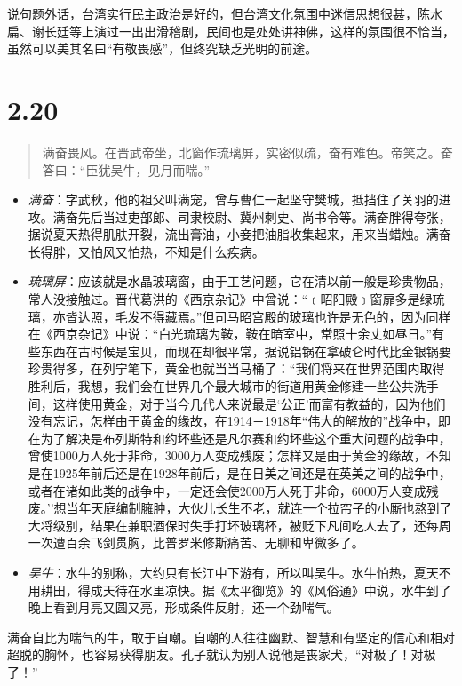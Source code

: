 \documentclass[]{book}
\providecommand{\tightlist}{%
  \setlength{\itemsep}{0pt}\setlength{\parskip}{0pt}}
\begin{document}
说句题外话，台湾实行民主政治是好的，但台湾文化氛围中迷信思想很甚，陈水扁、谢长廷等上演过一出出滑稽剧，民间也是处处讲神佛，这样的氛围很不恰当，虽然可以美其名曰``有敬畏感''，但终究缺乏光明的前途。

\section{2.20}\label{section-66}

\begin{quote}
满奋畏风。在晋武帝坐，北窗作琉璃屏，实密似疏，奋有难色。帝笑之。奋答曰：``臣犹吴牛，见月而喘。''
\end{quote}

\begin{itemize}
\tightlist
\item
  \emph{满奋}：字武秋，他的祖父叫满宠，曾与曹仁一起坚守樊城，抵挡住了关羽的进攻。满奋先后当过吏部郎、司隶校尉、冀州刺史、尚书令等。满奋胖得夸张，据说夏天热得肌肤开裂，流出膏油，小妾把油脂收集起来，用来当蜡烛。满奋长得胖，又怕风又怕热，不知是什么疾病。
\item
  \emph{琉璃屏}：应该就是水晶玻璃窗，由于工艺问题，它在清以前一般是珍贵物品，常人没接触过。晋代葛洪的《西京杂记》中曾说：``﹝昭阳殿﹞窗扉多是绿琉璃，亦皆达照，毛发不得藏焉。''但司马昭宫殿的玻璃也许是无色的，因为同样在《西京杂记》中说：``白光琉璃为鞍，鞍在暗室中，常照十余丈如昼日。''有些东西在古时候是宝贝，而现在却很平常，据说铝锅在拿破仑时代比金银锅要珍贵得多，在列宁笔下，黄金也就当当马桶了：``我们将来在世界范围内取得胜利后，我想，我们会在世界几个最大城市的街道用黄金修建一些公共洗手间，这样使用黄金，对于当今几代人来说最是`公正'而富有教益的，因为他们没有忘记，怎样由于黄金的缘故，在1914－1918年``伟大的解放的''战争中，即在为了解决是布列斯特和约坏些还是凡尔赛和约坏些这个重大问题的战争中，曾使1000万人死于非命，3000万人变成残废；怎样又是由于黄金的缘故，不知是在1925年前后还是在1928年前后，是在日美之间还是在英美之间的战争中，或者在诸如此类的战争中，一定还会使2000万人死于非命，6000万人变成残废。''想当年天庭编制臃肿，大伙儿长生不老，就连一个拉帘子的小厮也熬到了大将级别，结果在兼职酒保时失手打坏玻璃杯，被贬下凡间吃人去了，还每周一次遭百余飞剑贯胸，比普罗米修斯痛苦、无聊和卑微多了。
\item
  \emph{吴牛}：水牛的别称，大约只有长江中下游有，所以叫吴牛。水牛怕热，夏天不用耕田，得成天待在水里凉快。据《太平御览》的《风俗通》中说，水牛到了晚上看到月亮又圆又亮，形成条件反射，还一个劲喘气。
\end{itemize}

满奋自比为喘气的牛，敢于自嘲。自嘲的人往往幽默、智慧和有坚定的信心和相对超脱的胸怀，也容易获得朋友。孔子就认为别人说他是丧家犬，``对极了！对极了！''　　　　
\end{document}
